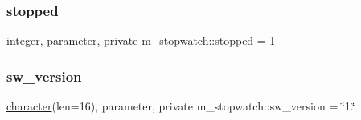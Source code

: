 \mbox{\label{namespacem__stopwatch_ab81a5f83e4190cfadc0312bfb82042a8}} 
\subsubsection{\texorpdfstring{stopped}{stopped}}
{\footnotesize\ttfamily integer, parameter, private m\+\_\+stopwatch\+::stopped = 1\hspace{0.3cm}{\ttfamily [private]}}

\mbox{\label{namespacem__stopwatch_af92219c7ffaec61677d2eeb5004e598c}} 
\subsubsection{\texorpdfstring{sw\+\_\+version}{sw\_version}}
{\footnotesize\ttfamily \hyperlink{option__stopwatch_83_8txt_abd4b21fbbd175834027b5224bfe97e66}{character}(len=16), parameter, private m\+\_\+stopwatch\+::sw\+\_\+version = \char`\"{}1.\char`\"{}\hspace{0.3cm}{\ttfamily [private]}}

